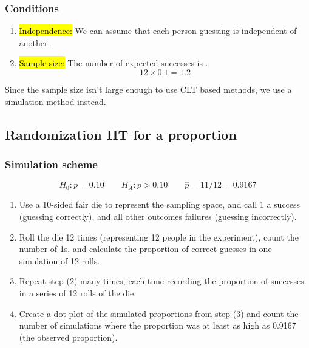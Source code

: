 
\begin{frame}
\frametitle{Conditions}

\begin{enumerate}

\item \hl{Independence:} We can assume that each person guessing is independent of another.

\item \hl{Sample size:} The number of expected successes is .
\[ 12 \times 0.1 = 1.2 \]

\end{enumerate}


Since the sample size isn't large enough to use CLT based methods, we use a simulation method instead.

\end{frame}


\subsection{Randomization HT for a proportion}


\begin{frame}
\frametitle{Simulation scheme}

\vspace{-0.5cm}
\[ H_0: p = 0.10 \qquad H_A: p > 0.10 \qquad \hat{p} = 11 / 12 = 0.9167 \]

\begin{enumerate}

\item Use a 10-sided fair die to represent the sampling space, and call 1 a success (guessing correctly), and all other outcomes failures (guessing incorrectly).

\item Roll the die 12 times (representing 12 people in the experiment), count the number of 1s, and calculate the proportion of correct guesses in one simulation of 12 rolls.

\item Repeat step (2) many times, each time recording the proportion of successes in a series of 12 rolls of the die.

\item Create a dot plot of the simulated proportions from step (3) and count the number of simulations where the proportion was at least as high as 0.9167 (the observed proportion).

\end{enumerate}

\end{frame}

